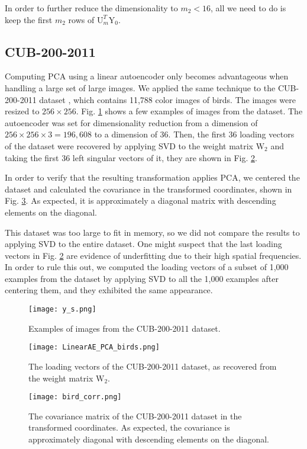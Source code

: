 \documentclass[journal]{IEEEtran}
\begin{document}
In order to further reduce the dimensionality to $m_2 < 16$, all we need to do is keep the first $m_2$ rows of $\text{U}_m^T \text{Y}_0$.

\subsection{CUB-200-2011}
Computing PCA using a linear autoencoder only becomes advantageous when handling a large set of large images. We applied the same technique to the CUB-200-2011 dataset \cite{WahCUB}, which contains 11,788 color images of birds. The images were resized to $256 \times 256$. Fig. \ref{fig2.5} shows a few examples of images from the dataset. The autoencoder was set for dimensionality reduction from a dimension of $256 \times 256 \times 3 = 196,608$ to a dimension of 36. Then, the first 36 loading vectors of the dataset were recovered by applying SVD to the weight matrix $\text{W}_2$ and taking the first 36 left singular vectors of it, they are shown in Fig. \ref{fig3}.

In order to verify that the resulting transformation applies PCA, we centered the dataset and calculated the covariance in the transformed coordinates, shown in Fig. \ref{fig4}. As expected, it is approximately a diagonal matrix with descending elements on the diagonal.

This dataset was too large to fit in memory, so we did not compare the results to applying SVD to the entire dataset. One might suspect that the last loading vectors in Fig. \ref{fig3} are evidence of underfitting due to their high spatial frequencies. In order to rule this out, we computed the loading vectors of a subset of 1,000 examples from the dataset by applying SVD to all the 1,000 examples after centering them, and they exhibited the same appearance.

\begin{figure}[!t]
\centering
\texttt{[image: y\_s.png]}
\caption{Examples of images from the CUB-200-2011 dataset.}
\label{fig2.5}
\end{figure}
\begin{figure}[!t]
\centering
\texttt{[image: LinearAE\_PCA\_birds.png]}
\caption{The loading vectors of the CUB-200-2011 dataset, as recovered from the weight matrix $\text{W}_2$.}
\label{fig3}
\end{figure}
\begin{figure}[!t]
\centering
\texttt{[image: bird\_corr.png]}
\caption{The covariance matrix of the CUB-200-2011 dataset in the transformed coordinates. As expected, the covariance is approximately diagonal with descending elements on the diagonal.}
\label{fig4}
\end{figure}
\end{document}
